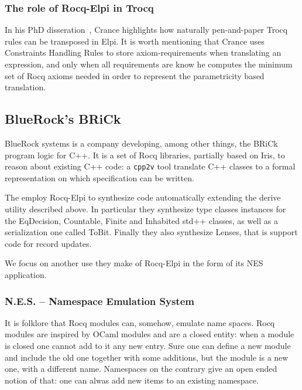 \documentclass[a4paper, 11pt]{book}
\begin{document}
\subsubsection{The role of Rocq-Elpi in Trocq}

In his PhD disseration~\cite[Page 115]{enzo}, Crance
highlights how naturally pen-and-paper Trocq rules can be transposed in Elpi.
It is worth mentioning that Crance uses Constraints Handling Rules to
store axiom-requirements when translating an expression, and only when
all requirements are know he computes the minimum set of Rocq axioms
needed in order to represent the parametricity based translation.



\subsection{BlueRock's BRiCk}

BlueRock systems is a company developing, among other things, the BRiCk
program logic for C++. It is a set of Rocq libraries, partially based on Iris,
to reason about existing C++ code: a \texttt{cpp2v} tool translate C++
classes to a formal representation on which specification can be written.

The employ Rocq-Elpi to synthesize code automatically extending the
derive utility described above. In particular they synthesize
type classes instances for the EqDecision, Countable, Finite and Inhabited
std++ classes, as well as a serialization one called ToBit. Finally
they also synthesize Lenses, that is support code for record updates.

We focus on another use they make of Rocq-Elpi in the form of its
NES application.

\subsubsection{N.E.S. -- Namespace Emulation System}

It is folklore that Rocq modules can, somehow, emulate name spaces.
Rocq modules are inspired by OCaml modules and are a closed entity: when
a module is closed one cannot add to it any new entry. Sure one can
define a new module and include the old one together with some additions,
but the module is a new one, with a different name. Namespaces on the
contrary give an open ended notion of that: one can alwas add new items
to an existing namespace.
\end{document}
